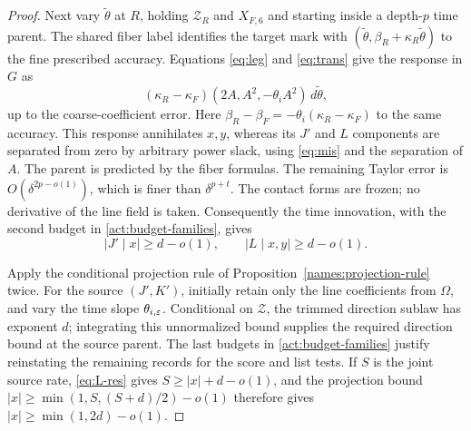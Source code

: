 \begin{proof}
Next vary $\widetilde\theta$ at $R$, holding $\mathscr Z_R$ and
$X_{F,6}$ and starting inside a depth-$p$ time parent.  The shared
fiber label identifies the target mark with
$(\widetilde\theta,\beta_R+\kappa_R\widetilde\theta)$ to the
fine prescribed accuracy.  Equations \eqref{eq:leg} and
\eqref{eq:trans} give the response in $G$ as
\[
 (\kappa_R-\kappa_F)(2A,A^2,-\theta_i A^2)\,d\widetilde\theta,
\]
up to the coarse-coefficient error.  Here
$\beta_R-\beta_F=-\theta_i(\kappa_R-\kappa_F)$ to the same
accuracy.  This response annihilates $x,y$, whereas its $J'$ and
$L$ components are separated from zero by arbitrary power slack,
using \eqref{eq:mis} and the separation of $A$.  The parent is
predicted by the fiber formulas.  The remaining Taylor error is
$O(\delta^{2p-o(1)})$, which is finer than $\delta^{p+t}$.
The contact forms are frozen; no derivative of the line field is
taken.  Consequently the time innovation, with the second budget
in \eqref{act:budget-families}, gives
\begin{equation}
 |J'\mid x|\ge d-o(1),\qquad |L\mid x,y|\ge d-o(1).
 \tag{L-res}\label{eq:L-res}
\end{equation}

Apply the conditional projection rule of
Proposition~\ref{names:projection-rule} twice. For the source $(J',K')$,
initially retain only the line coefficients from
$\Omega$, and vary the time slope $\theta_{i,\varepsilon}$.  Conditional
on $\mathscr Z$, the trimmed direction sublaw has exponent $d$;
integrating this unnormalized bound supplies the required direction
bound at the source parent.  The last budgets in
\eqref{act:budget-families} justify reinstating the remaining records
for the score and list tests.  If $S$ is the joint source rate,
\eqref{eq:L-res} gives $S\ge|x|+d-o(1)$, and the projection bound
$|x|\ge\min(1,S,(S+d)/2)-o(1)$ therefore gives
$|x|\ge\min(1,2d)-o(1)$.


\end{proof}
